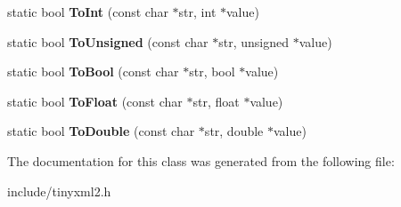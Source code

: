 \begin{DoxyCompactItemize}
\item 
\hypertarget{classtinyxml2_1_1_x_m_l_util_ac7fa220dd1c428ed6a77850d56a6e4bf}{}static bool {\bfseries To\+Int} (const char $\ast$str, int $\ast$value)\label{classtinyxml2_1_1_x_m_l_util_ac7fa220dd1c428ed6a77850d56a6e4bf}

\item 
\hypertarget{classtinyxml2_1_1_x_m_l_util_a46f7e9542929001e726853ed8b571c07}{}static bool {\bfseries To\+Unsigned} (const char $\ast$str, unsigned $\ast$value)\label{classtinyxml2_1_1_x_m_l_util_a46f7e9542929001e726853ed8b571c07}

\item 
\hypertarget{classtinyxml2_1_1_x_m_l_util_ae1692c644a807da2cd9e1e45f79a102f}{}static bool {\bfseries To\+Bool} (const char $\ast$str, bool $\ast$value)\label{classtinyxml2_1_1_x_m_l_util_ae1692c644a807da2cd9e1e45f79a102f}

\item 
\hypertarget{classtinyxml2_1_1_x_m_l_util_ac13b56b82e7f1d2d3954666b76c67d22}{}static bool {\bfseries To\+Float} (const char $\ast$str, float $\ast$value)\label{classtinyxml2_1_1_x_m_l_util_ac13b56b82e7f1d2d3954666b76c67d22}

\item 
\hypertarget{classtinyxml2_1_1_x_m_l_util_a7e37ab30ba19c2b02042ab093172e9b8}{}static bool {\bfseries To\+Double} (const char $\ast$str, double $\ast$value)\label{classtinyxml2_1_1_x_m_l_util_a7e37ab30ba19c2b02042ab093172e9b8}

\end{DoxyCompactItemize}


The documentation for this class was generated from the following file\+:\begin{DoxyCompactItemize}
\item 
include/tinyxml2.\+h\end{DoxyCompactItemize}
